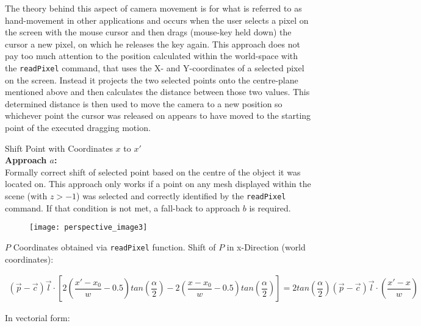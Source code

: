 The theory behind this aspect of camera movement is for what is referred to as hand-movement in other applications and occurs when the user selects a pixel on the screen with the mouse cursor and then drags (mouse-key held down) the cursor a new pixel, on which he releases the key again.
This approach does not pay too much attention to the position calculated within the world-space with the \verb|readPixel| command, that uses the X- and Y-coordinates of a selected pixel on the screen. Instead it projects the two selected points onto the centre-plane mentioned above and then calculates the distance between those two values. This determined distance is then used to move the camera to a new position so whichever point the cursor was released on appears to have moved to the starting point of the executed dragging motion.


Shift Point with Coordinates $x$ to $x'$ \\

\noindent\textbf{Approach $a$:} \\
Formally correct shift of selected point based on the centre of the object it was located on. This approach only works if a point on any \gls{mesh} displayed within the scene (with $z > -1$) was selected and correctly identified by the \verb|readPixel| command. If that condition is not met, a fall-back to approach $b$ is required.

\begin{figure}[h!]
	\centering
	\texttt{[image: perspective\_image3]}	
\end{figure}
$P$ Coordinates obtained via \verb|readPixel| function.	 
Shift of $P$ in x-Direction (world coordinates):

\begin{align*}\left(\overrightarrow{p} - \overrightarrow{c}\right)\overrightarrow{l} \cdot \left[2\left(\dfrac{x' - x_{0}}{w} - 0.5\right)tan\left(\dfrac{\alpha}{2}\right) - 2\left(\dfrac{x - x_{0}}{w} - 0.5\right)tan\left(\dfrac{\alpha}{2} \right)\right] = 2tan\left(\dfrac{\alpha}{2}\right)\left(\overrightarrow{p} - \overrightarrow{c}\right) \overrightarrow{l} \cdot \left(\dfrac{x' - x}{w} \right) 	\end{align*}

In vectorial form:                                                                                                                                                                                                                     

